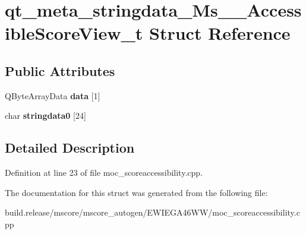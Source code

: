 \hypertarget{structqt__meta__stringdata___ms_____accessible_score_view__t}{}\section{qt\+\_\+meta\+\_\+stringdata\+\_\+\+Ms\+\_\+\+\_\+\+Accessible\+Score\+View\+\_\+t Struct Reference}
\label{structqt__meta__stringdata___ms_____accessible_score_view__t}
\subsection*{Public Attributes}
\begin{DoxyCompactItemize}
\item 
\mbox{\label{structqt__meta__stringdata___ms_____accessible_score_view__t_a2550b59a7d6399908ff50725a9cc6fed}} 
Q\+Byte\+Array\+Data {\bfseries data} \mbox{[}1\mbox{]}
\item 
\mbox{\label{structqt__meta__stringdata___ms_____accessible_score_view__t_acfb2747eea31c135690b684e6630d928}} 
char {\bfseries stringdata0} \mbox{[}24\mbox{]}
\end{DoxyCompactItemize}


\subsection{Detailed Description}


Definition at line 23 of file moc\+\_\+scoreaccessibility.\+cpp.



The documentation for this struct was generated from the following file\+:\begin{DoxyCompactItemize}
\item 
build.\+release/mscore/mscore\+\_\+autogen/\+E\+W\+I\+E\+G\+A46\+W\+W/moc\+\_\+scoreaccessibility.\+cpp\end{DoxyCompactItemize}
